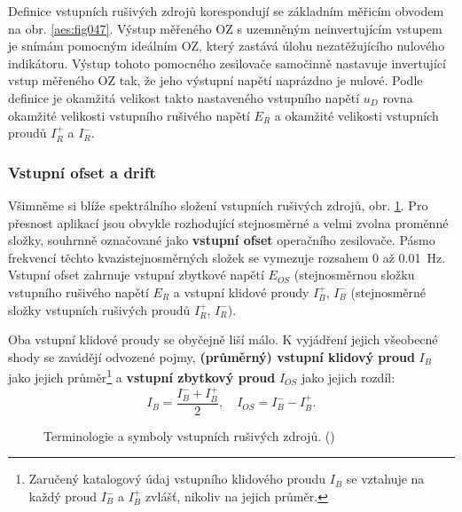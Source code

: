 
        Definice vstupních rušivých zdrojů korespondují se základním měřicím obvodem na obr.
        \ref{aes:fig047}. Výstup měřeného OZ s uzemněným neinvertujícím vstupem je snímám pomocným
        ideálním OZ, který zastává úlohu nezatěžujícího nulového indikátoru. Výstup tohoto pomocného
        zesilovače samočinně nastavuje invertující vstup měřeného OZ tak, že jeho výstupní napětí
        naprázdno je nulové. Podle definice je okamžitá velikost takto nastaveného vstupního napětí
        \(u_D\) rovna okamžité velikosti vstupního rušivého napětí \(E_R\) a okamžité velikosti
        vstupních proudů \(I_R^+\) a \(I_R^-\).

      \subsubsection{Vstupní ofset a drift}\label{aesIchIIIsecIIssecIII}
        Všimněme si blíže spektrálního složení vstupních rušivých zdrojů, obr. \ref{aes:fig048}. Pro
        přesnost aplikací jsou obvykle rozhodující stejnosměrné a velmi zvolna proměnné složky,
        souhrnně označované jako \textbf{vstupní ofset} operačního zesilovače. Pásmo frekvencí
        těchto kvazistejnosměrných složek se vymezuje rozsahem \num{0} až \qty{0.01}{\Hz}. Vstupní
        ofset zahrnuje vstupní zbytkové napětí \(E_{OS}\) (stejnosměrnou složku vstupního rušivého
        napětí \(E_R\) a vstupní klidové proudy \(I_B^+\), \(I_B^-\) (stejnosměrné složky vstupních
        rušivých proudů \(I_R^+\), \(I_R^-\)).
              
        Oba vstupní klidové proudy se obyčejně liší málo. K vyjádření jejich všeobecné shody se
        zavádějí odvozené pojmy, \textbf{(průměrný) vstupní klidový proud} \(I_B\) jako jejich
        průměr\footnote{Zaručený katalogový údaj vstupního klidového proudu \(I_B\) se vztahuje na
        každý proud \(I_B^-\) a \(I_B^+\) zvlášť, nikoliv na jejich průměr.} a \textbf{vstupní
        zbytkový proud} \(I_{OS}\) jako jejich rozdíl:
        \begin{equation}\label{aes:eq090}
          I_B = \dfrac{I_B^- + I_B^+}{2}, \quad I_{OS} = I_B^- - I_B^+.
        \end{equation}
        
        \begin{figure}[ht!] %
          \centering
          \caption{Terminologie a symboly vstupních rušivých zdrojů. (\cite[s.~16]{Dostal})}
          \label{aes:fig048}
        \end{figure}

